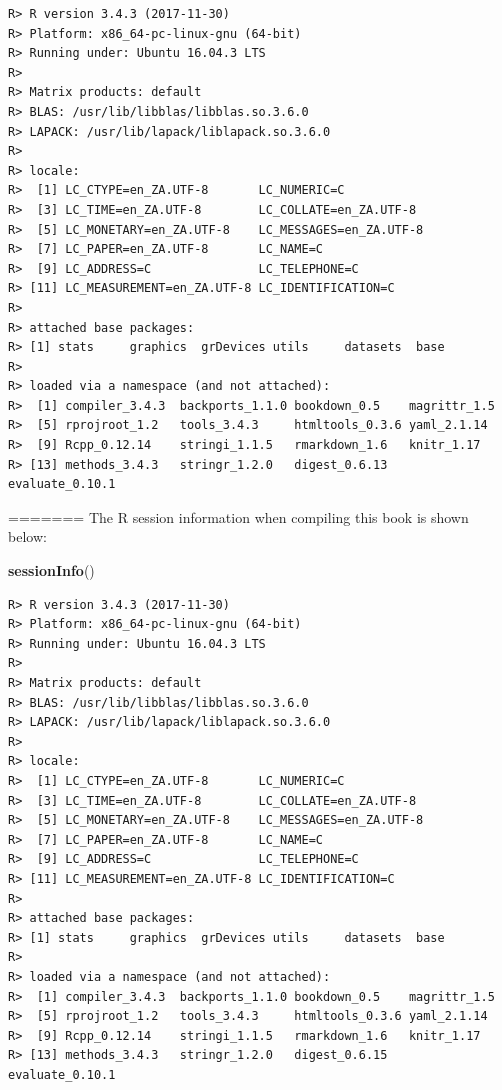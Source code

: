 \documentclass[]{book}
\newenvironment{Shaded}{\begin{snugshade}}{\end{snugshade}}
\newcommand{\KeywordTok}[1]{\textcolor[rgb]{0.13,0.29,0.53}{\textbf{#1}}}
\newcommand{\NormalTok}[1]{#1}
\theoremstyle{definition}
\theoremstyle{definition}
\theoremstyle{definition}
\theoremstyle{remark}
\begin{document}
\begin{verbatim}
R> R version 3.4.3 (2017-11-30)
R> Platform: x86_64-pc-linux-gnu (64-bit)
R> Running under: Ubuntu 16.04.3 LTS
R> 
R> Matrix products: default
R> BLAS: /usr/lib/libblas/libblas.so.3.6.0
R> LAPACK: /usr/lib/lapack/liblapack.so.3.6.0
R> 
R> locale:
R>  [1] LC_CTYPE=en_ZA.UTF-8       LC_NUMERIC=C              
R>  [3] LC_TIME=en_ZA.UTF-8        LC_COLLATE=en_ZA.UTF-8    
R>  [5] LC_MONETARY=en_ZA.UTF-8    LC_MESSAGES=en_ZA.UTF-8   
R>  [7] LC_PAPER=en_ZA.UTF-8       LC_NAME=C                 
R>  [9] LC_ADDRESS=C               LC_TELEPHONE=C            
R> [11] LC_MEASUREMENT=en_ZA.UTF-8 LC_IDENTIFICATION=C       
R> 
R> attached base packages:
R> [1] stats     graphics  grDevices utils     datasets  base     
R> 
R> loaded via a namespace (and not attached):
R>  [1] compiler_3.4.3  backports_1.1.0 bookdown_0.5    magrittr_1.5   
R>  [5] rprojroot_1.2   tools_3.4.3     htmltools_0.3.6 yaml_2.1.14    
R>  [9] Rcpp_0.12.14    stringi_1.1.5   rmarkdown_1.6   knitr_1.17     
R> [13] methods_3.4.3   stringr_1.2.0   digest_0.6.13   evaluate_0.10.1
\end{verbatim}

=======
The R session information when compiling this book is shown below:

\begin{Shaded}
\begin{Highlighting}[]
\KeywordTok{sessionInfo}\NormalTok{()}
\end{Highlighting}
\end{Shaded}

\begin{verbatim}
R> R version 3.4.3 (2017-11-30)
R> Platform: x86_64-pc-linux-gnu (64-bit)
R> Running under: Ubuntu 16.04.3 LTS
R> 
R> Matrix products: default
R> BLAS: /usr/lib/libblas/libblas.so.3.6.0
R> LAPACK: /usr/lib/lapack/liblapack.so.3.6.0
R> 
R> locale:
R>  [1] LC_CTYPE=en_ZA.UTF-8       LC_NUMERIC=C              
R>  [3] LC_TIME=en_ZA.UTF-8        LC_COLLATE=en_ZA.UTF-8    
R>  [5] LC_MONETARY=en_ZA.UTF-8    LC_MESSAGES=en_ZA.UTF-8   
R>  [7] LC_PAPER=en_ZA.UTF-8       LC_NAME=C                 
R>  [9] LC_ADDRESS=C               LC_TELEPHONE=C            
R> [11] LC_MEASUREMENT=en_ZA.UTF-8 LC_IDENTIFICATION=C       
R> 
R> attached base packages:
R> [1] stats     graphics  grDevices utils     datasets  base     
R> 
R> loaded via a namespace (and not attached):
R>  [1] compiler_3.4.3  backports_1.1.0 bookdown_0.5    magrittr_1.5   
R>  [5] rprojroot_1.2   tools_3.4.3     htmltools_0.3.6 yaml_2.1.14    
R>  [9] Rcpp_0.12.14    stringi_1.1.5   rmarkdown_1.6   knitr_1.17     
R> [13] methods_3.4.3   stringr_1.2.0   digest_0.6.15   evaluate_0.10.1
\end{verbatim}
\end{document}

